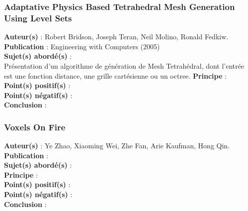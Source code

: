 \documentclass[a4paper,10pt]{article}
\begin{document}
\subsubsection{Adaptative Physics Based Tetrahedral Mesh Generation Using Level Sets}
\textbf{Auteur(s)} : Robert Bridson, Joseph Teran, Neil Molino, Ronald Fedkiw.\\
\textbf{Publication} : Engineering with Computers (2005)\\
\textbf{Sujet(s) abordé(s)} : \\
	Présentation d'un algorithme de génération de Mesh Tetrahédral, dont l'entrée est une fonction distance, une grille cartésienne ou un octree.
\textbf{Principe} :\\	
\textbf{Point(s) positif(s)} :\\
\textbf{Point(s) négatif(s)} :\\
\textbf{Conclusion} :\\



\subsubsection{Voxels On Fire}
\textbf{Auteur(s)} : Ye Zhao, Xiaoming Wei, Zhe Fan, Arie Kaufman, Hong Qin.\\
\textbf{Publication} :\\
\textbf{Sujet(s) abordé(s)} : \\
\textbf{Principe} :\\	
\textbf{Point(s) positif(s)} :\\
\textbf{Point(s) négatif(s)} :\\
\textbf{Conclusion} :\\
\end{document}
